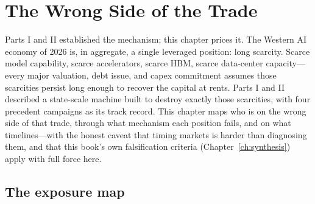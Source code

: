 \chapter{The Wrong Side of the Trade}
\label{ch:trade}

Parts I and II established the mechanism; this chapter prices it. The Western AI economy of 2026 is, in aggregate, a single leveraged position: long scarcity. Scarce model capability, scarce accelerators, scarce HBM, scarce data-center capacity---every major valuation, debt issue, and capex commitment assumes those scarcities persist long enough to recover the capital at rents. Parts I and II described a state-scale machine built to destroy exactly those scarcities, with four precedent campaigns as its track record. This chapter maps who is on the wrong side of that trade, through what mechanism each position fails, and on what timelines---with the honest caveat that timing markets is harder than diagnosing them, and that this book's own falsification criteria (Chapter~\ref{ch:synthesis}) apply with full force here.

\section{The exposure map}
\label{sec:exposure}

